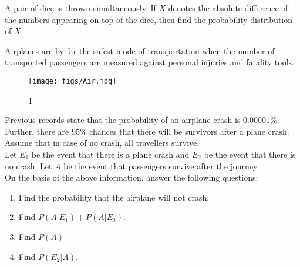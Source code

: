 	\item A pair of dice is thrown simultaneously. If $X$ denotes the absolute difference of the numbers appearing on top of the dice, then find the probability distribution of $X$.
	\item Airplanes are by far the safest mode of transportation when the number of transported passengers are measured against personal injuries and fatality tools.
		\begin{figure}[h]
			\centering
			     \texttt{[image: figs/Air.jpg]}
			     \caption{1}
			\label{Figure}
		\end{figure}
	      Previous records state that the probability of an airplane crash is $0.00001\%$. Further, there are $95\%$ chances that there will be survivors after a plane crash. Assume that in case of no crash, all travellers survive.\\
		Let $E_{1}$ be the event that there is a plane crash and $E_{2}$ be the event that there is no crash. Let $A$ be the event that passengers survive after the journey.\\
	      On the basis of the above information, answer the following questions:
		\begin{enumerate}[label=(\roman*)]
			\item Find the probability that the airplane will not crash.
			\item Find $P(A|E_{1}) + P(A|E_{2})$.
			\item Find $P(A)$
			\item Find $P(E_{2} | A)$.
		\end{enumerate}




